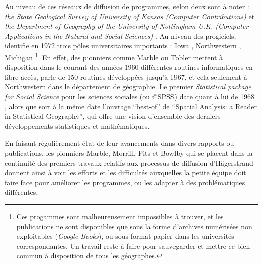 Au niveau de ces réseaux de diffusion de programmes, selon \textcite[20-21]{Greer1972} deux sont à noter : \textit{the State Geological Survey of University of Kansas (Computer Contributions)}  et \textit{ the Department of Geography of the University of Nottingham U.K. (Computer Applications in the Natural and Social Sciences) }. Au niveau des progiciels, \textcite[20-21]{Greer1972} identifie en 1972 trois pôles universitaires importants : Iowa \autocite{Wittick1968}, Northwestern \autocite{Marble1967}, Michigan \autocite{Tobler1970c}\footnote{Ces progammes sont malheureusement impossibles à trouver, et les publications ne sont disponibles que sous la forme d'archives numérisées non exploitables (\textit{Google Books}), ou sous format papier dans les universités correspondantes. Un travail reste à faire pour sauvegarder et mettre ce bien commun à disposition de tous les géographes.}. En effet, des pionniers comme Marble ou Tobler mettent à disposition dans le courant des années 1960 différentes routines informatiques en libre accès, \textcite[3]{Marble1967} parle de 150 routines développées jusqu'à 1967, et cela seulement à Northwestern dans le département de géographie. Le premier \textit{Statistical package for Social Science} pour les sciences sociales (ou \href{http://www.spss.com.hk/corpinfo/history.htm}{@SPSS}) date quant à lui de 1968 \autocite{Barnes2011}, alors que sort à la même date l'ouvrage \foreignquote{english}{best-of} de \textcite{Berry1968} \foreignquote{english}{Spatial Analysis: a Reader in Statistical Geography}, qui offre une vision d'ensemble des derniers développements statistiques et mathématiques.


En faisant régulièrement état de leur avancements dans divers rapports ou publications, les pionniers Marble, Morrill, Pits et Bowlby \autocite{Pitts1963} qui se placent dans la continuité des premiers travaux relatifs aux processus de diffusion d'Hägerstrand \autocite{Hagerstrand1953, Hagerstrand1967a} donnent ainsi à voir les efforts et les difficultés auxquelles la petite équipe doit faire face pour améliorer les programmes, ou les adapter à des problématiques différentes.


